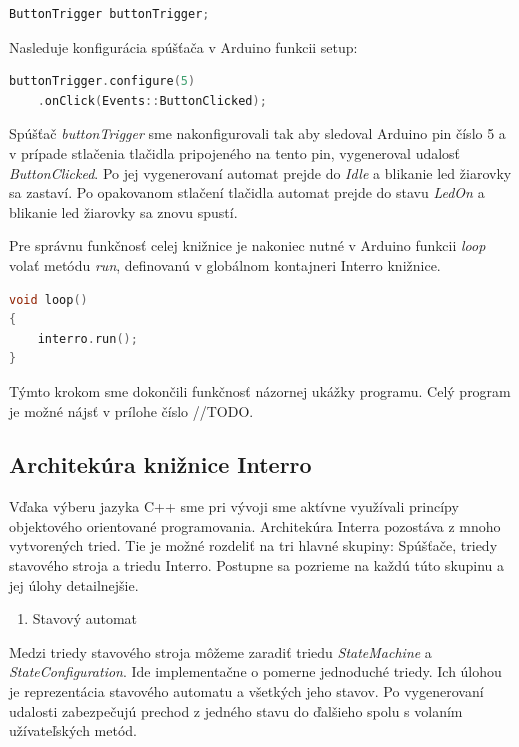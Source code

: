 \begin{lstlisting}[language=c++]  
ButtonTrigger buttonTrigger;            
\end{lstlisting}

Nasleduje konfigurácia spúšťača v Arduino funkcii setup:
\begin{lstlisting}[language=c++]  
buttonTrigger.configure(5)
    .onClick(Events::ButtonClicked); 
\end{lstlisting}

Spúšťač \textit{buttonTrigger} sme nakonfigurovali tak aby sledoval Arduino pin číslo 5 a v prípade stlačenia tlačidla pripojeného na tento pin, vygeneroval udalosť
\textit{ButtonClicked}. Po jej vygenerovaní automat prejde do  \textit{Idle} a blikanie led žiarovky sa zastaví. Po opakovanom stlačení tlačidla automat prejde do
stavu \textit{LedOn} a blikanie led žiarovky sa znovu spustí. \par
Pre správnu funkčnosť celej knižnice je nakoniec nutné v Arduino funkcii \textit{loop} volať metódu \textit{run}, definovanú v globálnom kontajneri Interro knižnice.
\begin{lstlisting}[language=c++]  
void loop()
{
    interro.run();
}
\end{lstlisting}

Týmto krokom sme dokončili funkčnosť názornej ukážky programu. Celý program je možné nájsť v prílohe číslo //TODO.

\subsection{Architekúra knižnice Interro}
Vďaka výberu jazyka C++ sme pri vývoji sme aktívne využívali princípy objektového orientované programovania. Architekúra Interra pozostáva z mnoho vytvorených tried.
Tie je možné rozdeliť na tri hlavné skupiny: Spúšťače, triedy stavového stroja a triedu Interro.
Postupne sa pozrieme na každú túto skupinu a jej úlohy detailnejšie. \par
\begin{enumerate}
    \item Stavový automat
\end{enumerate}
Medzi triedy stavového stroja môžeme zaradiť triedu \textit{StateMachine} a \textit{StateConfiguration}. Ide implementačne o pomerne jednoduché triedy. Ich úlohou
je reprezentácia stavového automatu a všetkých jeho stavov. Po vygenerovaní udalosti zabezpečujú prechod z jedného stavu do ďalšieho spolu s volaním užívateľských
metód. \par

